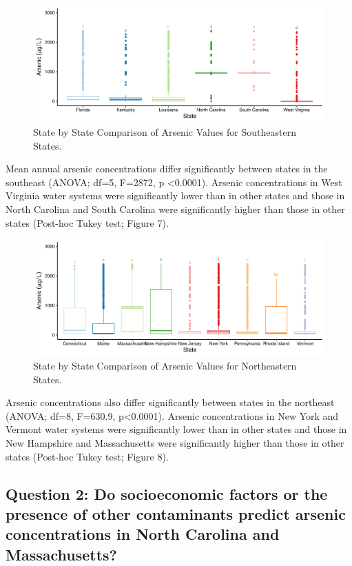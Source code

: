 \documentclass[12pt,]{article}
\begin{document}
\begin{figure}
\centering
\includegraphics{Project_Template_files/figure-latex/figs7-1.pdf}
\caption{State by State Comparison of Arsenic Values for Southeastern
States.}
\end{figure}

Mean annual arsenic concentrations differ significantly between states
in the southeast (ANOVA; df=5, F=2872, p \textless{}0.0001). Arsenic
concentrations in West Virginia water systems were significantly lower
than in other states and those in North Carolina and South Carolina were
significantly higher than those in other states (Post-hoc Tukey test;
Figure 7).

\newpage

\begin{figure}
\centering
\includegraphics{Project_Template_files/figure-latex/figs8-1.pdf}
\caption{State by State Comparison of Arsenic Values for Northeastern
States.}
\end{figure}

Arsenic concentrations also differ significantly between states in the
northeast (ANOVA; df=8, F=630.9, p\textless{}0.0001). Arsenic
concentrations in New York and Vermont water systems were significantly
lower than in other states and those in New Hampshire and Massachusetts
were significantly higher than those in other states (Post-hoc Tukey
test; Figure 8).

\newpage

\hypertarget{question-2-do-socioeconomic-factors-or-the-presence-of-other-contaminants-predict-arsenic-concentrations-in-north-carolina-and-massachusetts}{%
\subsection{Question 2: Do socioeconomic factors or the presence of
other contaminants predict arsenic concentrations in North Carolina and
Massachusetts?}\label{question-2-do-socioeconomic-factors-or-the-presence-of-other-contaminants-predict-arsenic-concentrations-in-north-carolina-and-massachusetts}}
\end{document}
